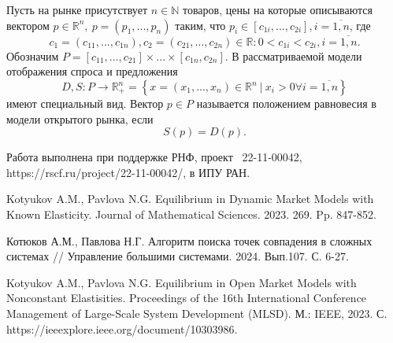 Пусть на рынке присутствует $n\in\mathbb{N}$ товаров, цены на которые описываются вектором $p\in\mathbb{R}^n, \ p=(p_1,...,p_n)$ таким, что $p_i\in[c_{1i},...,c_{2i}], i =\overline{1,n}$, где $$c_1=(c_{11},...,c_{1n}), c_2 = (c_{21},\ldots ,c_{2n})\in\mathbb{R}: 0<c_{1i}<c_{2i}, i =\overline{1,n}.$$ Обозначим $P = [c_{11},...,c_{21}]\times...\times[c_{1n},c_{2n}]$. В рассматриваемой модели отображения спроса и предложения $$D,S:P\to\mathbb{R}^n_+ = \left\{x=(x_1,...,x_n)\in\mathbb{R}^n \ | \ x_i > 0 \forall i = \overline{1,n}\right\}$$ имеют специальный вид. Вектор $p\in P$ называется положением равновесия в модели открытого рынка, если
$$
S(p) = D(p).
$$



Работа выполнена при поддержке РНФ, проект \textnumero~22-11-00042,  https://rscf.ru/project/22-11-00042/, в ИПУ РАН.
%



\begin{thebibliography}{9} %
 Kotyukov A.M., Pavlova N.G. Equilibrium in Dynamic Market Models with Known Elasticity. Journal of Mathematical Sciences. 2023. 269. Pp. 847-852.

 Котюков А.М., Павлова Н.Г. Алгоритм поиска точек совпадения в сложных системах // Управление большими системами. 2024. Вып.107. С. 6-27.

 Kotyukov A.M., Pavlova N.G. Equilibrium in Open Market Models with Nonconstant Elastisities. Proceedings of the 16th International Conference Management of Large-Scale System Development (MLSD). М.: IEEE, 2023. С. https://ieeexplore.ieee.org/document/10303986.


\end{thebibliography}





%
